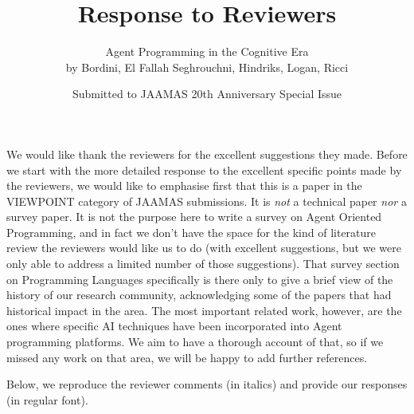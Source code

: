 \documentclass[12pt]{article}
\title{Response to Reviewers}
\author{Agent Programming in the Cognitive Era\\by Bordini, El Fallah Seghrouchni, Hindriks, Logan, Ricci}
\date{Submitted to JAAMAS 20th Anniversary Special Issue}
\begin{document}
\maketitle

We would like thank the reviewers for the excellent suggestions they made. Before we start with the more detailed response to the excellent specific points made by the reviewers, we would like to emphasise first that this is a paper in the VIEWPOINT category of JAAMAS submissions. It is \emph{not} a technical paper \emph{nor} a survey paper. It is not the purpose here to write a survey on Agent Oriented Programming, and in fact we don't have the space for the kind of literature review the reviewers would like us to do (with excellent suggestions, but we were only able to address a limited number of those suggestions). That survey section on Programming Languages specifically is there only to give a brief view of the history of our research community, acknowledging some of the papers that had historical impact in the area. The most important related work, however, are the ones where specific AI techniques have been incorporated into Agent programming platforms. We aim to have a thorough account of that, so if we missed any work on that area, we will be happy to add further references.

Below, we reproduce the reviewer comments (in italics) and provide our responses (in regular font).
\end{document}
